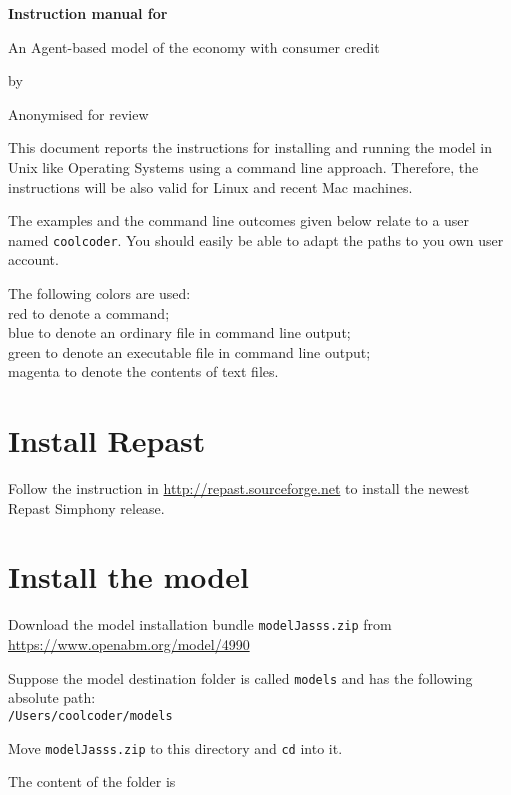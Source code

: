 \documentclass{article}
\begin{document}
\begin{center}
	{\bf
	Instruction manual for 

An Agent-based model of the economy with consumer credit
}

by

Anonymised for review
\end{center}


This document reports the instructions for installing and running the model in Unix like Operating Systems using a command line approach. Therefore, the instructions will be also valid for Linux and recent Mac machines.

The examples and the command line outcomes given below relate to a user named \verb+coolcoder+. You should easily be able to adapt the paths to you own user account. 

The following colors are used:\\
\color{red}red \color{black} to denote a command;\\
\color{blue}blue \color{black} to denote an ordinary file in command line output;\\
\color{green}green \color{black} to denote an executable file in command line output;\\
\color{magenta}magenta \color{black} to denote the contents of text files.\\

\section{Install Repast}

Follow the instruction in
\url{http://repast.sourceforge.net}
to install the newest Repast Simphony release.

\section{Install the model}

Download the model installation bundle \verb+modelJasss.zip+ from \\
\url{https://www.openabm.org/model/4990}

Suppose the model destination folder is called \verb+models+ and has the following absolute path: \\
\verb+/Users/coolcoder/models+

Move \verb+modelJasss.zip+ to this directory and \verb+cd+ into it.

The content of the folder is
\end{document}
